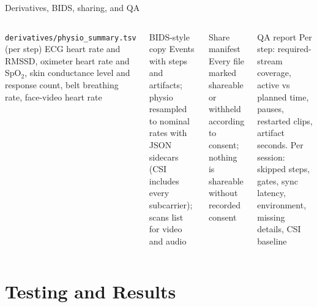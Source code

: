\documentclass[aspectratio=169,11pt]{beamer}
\newcommand{\code}[1]{{\small\texttt{#1}}}
\begin{document}
\begin{frame}{Derivatives, BIDS, sharing, and QA}
  \begin{columns}[T]
    \begin{block}{\code{derivatives/physio\_summary.tsv} (per step)}
      \footnotesize ECG heart rate and RMSSD, oximeter heart rate and SpO$_2$, skin conductance level and response count, belt breathing rate, face-video heart rate
    \end{block}
    \begin{block}{BIDS-style copy}
      \footnotesize Events with steps and artifacts; physio resampled to nominal rates with JSON sidecars (CSI includes every subcarrier); scans list for video and audio
    \end{block}
    \begin{block}{Share manifest}
      \footnotesize Every file marked shareable or withheld according to consent; nothing is shareable without recorded consent
    \end{block}
    \begin{block}{QA report}
      \footnotesize Per step: required-stream coverage, active vs planned time, pauses, restarted clips, artifact seconds. Per session: skipped steps, gates, sync latency, environment, missing details, CSI baseline
    \end{block}
  \end{columns}
\end{frame}

\section{Testing and Results}
\end{document}

